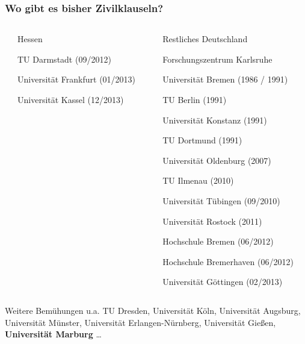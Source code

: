 \documentclass[presentation]{beamer}
\providecommand{\alert}[1]{\textbf{#1}}
\begin{document}
\begin{frame}
\frametitle{Wo gibt es bisher Zivilklauseln?}
\label{sec-1-5}
\begin{columns}[t] %
\label{sec-1-5-1}
\begin{column}{0.5\textwidth}
\begin{block}{Hessen}
\label{sec-1-5-1-1}

    TU Darmstadt (09/2012)

    Universität Frankfurt (01/2013)

    Universität Kassel (12/2013)
\pause
\end{block}
\end{column}
\begin{column}{0.5\textwidth}
\begin{block}{Restliches Deutschland}
\label{sec-1-5-1-2}

\fontsize{8pt}{9.6}\selectfont
     Forschungszentrum Karlsruhe

     Universität Bremen (1986 / 1991)
     
     TU Berlin (1991)

     Universität Konstanz (1991)

     TU Dortmund (1991)

\pause

     Universität Oldenburg (2007)

     TU Ilmenau (2010)

     Universität Tübingen (09/2010)

     Universität Rostock (2011)

     Hochschule Bremen (06/2012)

     Hochschule Bremerhaven (06/2012)

     Universität Göttingen (02/2013)
\end{block}
\end{column}
\end{columns}
\label{sec-1-5-2}

\pause
    Weitere Bemühungen u.a. TU Dresden, Universität Köln, Universität Augsburg, Universität Münster, Universität Erlangen-Nürnberg, Universität Gießen, \alert{Universität Marburg} \ldots{}
\end{frame}
\end{document}
